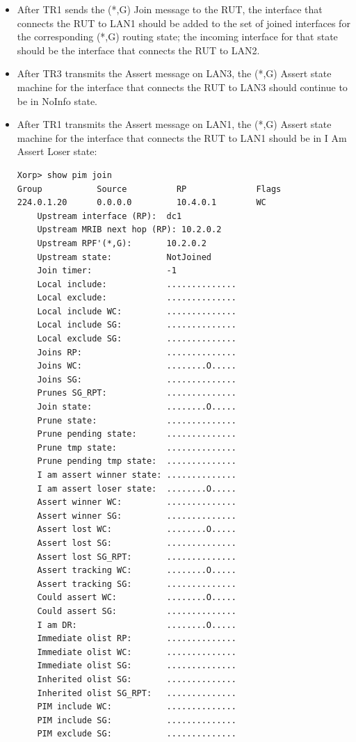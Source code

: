 \documentclass[11pt]{report}
\begin{document}
\begin{itemize}

  \item After TR1 sends the (*,G) Join message to the RUT, the interface that
  connects the RUT to LAN1 should be added to the set of joined interfaces for
  the corresponding (*,G) routing state; the incoming interface for that state
  should be the interface that connects the RUT to LAN2.

  \item After TR3 transmits the Assert message on LAN3, the (*,G) Assert state
  machine for the interface that connects the RUT to LAN3 should continue to
  be in NoInfo state.

  \item After TR1 transmits the Assert message on LAN1, the (*,G) Assert state
  machine for the interface that connects the RUT to LAN1 should be in I Am
  Assert Loser state:

\begin{verbatim}
Xorp> show pim join 
Group           Source          RP              Flags
224.0.1.20      0.0.0.0         10.4.0.1        WC   
    Upstream interface (RP):  dc1
    Upstream MRIB next hop (RP): 10.2.0.2
    Upstream RPF'(*,G):       10.2.0.2
    Upstream state:           NotJoined 
    Join timer:               -1
    Local include:            ..............
    Local exclude:            ..............
    Local include WC:         ..............
    Local include SG:         ..............
    Local exclude SG:         ..............
    Joins RP:                 ..............
    Joins WC:                 ........O.....
    Joins SG:                 ..............
    Prunes SG_RPT:            ..............
    Join state:               ........O.....
    Prune state:              ..............
    Prune pending state:      ..............
    Prune tmp state:          ..............
    Prune pending tmp state:  ..............
    I am assert winner state: ..............
    I am assert loser state:  ........O.....
    Assert winner WC:         ..............
    Assert winner SG:         ..............
    Assert lost WC:           ........O.....
    Assert lost SG:           ..............
    Assert lost SG_RPT:       ..............
    Assert tracking WC:       ........O.....
    Assert tracking SG:       ..............
    Could assert WC:          ........O.....
    Could assert SG:          ..............
    I am DR:                  ........O.....
    Immediate olist RP:       ..............
    Immediate olist WC:       ..............
    Immediate olist SG:       ..............
    Inherited olist SG:       ..............
    Inherited olist SG_RPT:   ..............
    PIM include WC:           ..............
    PIM include SG:           ..............
    PIM exclude SG:           ..............
\end{verbatim}


\end{itemize}
\end{document}
